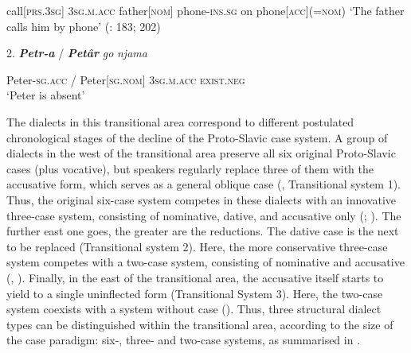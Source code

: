 \documentclass[output=paper]{langscibook}
\begin{document}
  call[\textsc{prs.3sg]}  \textsc{3sg.m}.\textsc{acc}  father[\textsc{nom]}  phone-\textsc{ins.sg}  on  phone[\textsc{acc](=nom)}  ‘The father calls him by phone’    (\citealt{Miloradović2002}: 183; 202)  

2.  \textbf{\textit{Petr-a} }   / \textbf{\textit{Petâr} }   \textit{go}    \textit{njama}

Peter-\textsc{sg.acc} /  Peter[\textsc{sg.nom]}  \textsc{3sg.m}.\textsc{acc}  \textsc{exist.neg}\\
‘Peter is absent’            \citep[163]{Stojkov1981}

The dialects in this transitional area correspond to different postulated chronological stages of the decline of the Proto-Slavic case system. A group of dialects in the west of the transitional area preserve all six original Proto-Slavic cases (plus vocative), but speakers regularly replace three of them with the accusative form, which serves as a general oblique case (, Transitional system 1). Thus, the original six-case system competes in these dialects with an innovative three-case system, consisting of nominative, dative, and accusative only (\citealt{Miloradović2003}; \citealt{Simić1972}). The further east one goes, the greater are the reductions. The dative case is the next to be replaced (Transitional system 2). Here, the more conservative three-case system competes with a two-case system, consisting of nominative and accusative (\citealt{Belić1905}, \citealt{Ivić1956}). Finally, in the east of the transitional area, the accusative itself starts to yield to a single uninflected form (Transitional System 3). Here, the two-case system coexists with a system without case (\citealt{Stojkov1975,Stojkov1981}). Thus, three structural dialect types can be distinguished within the transitional area, according to the size of the case paradigm: six-, three- and two-case systems, as summarised in .  

  
 
\end{document}
